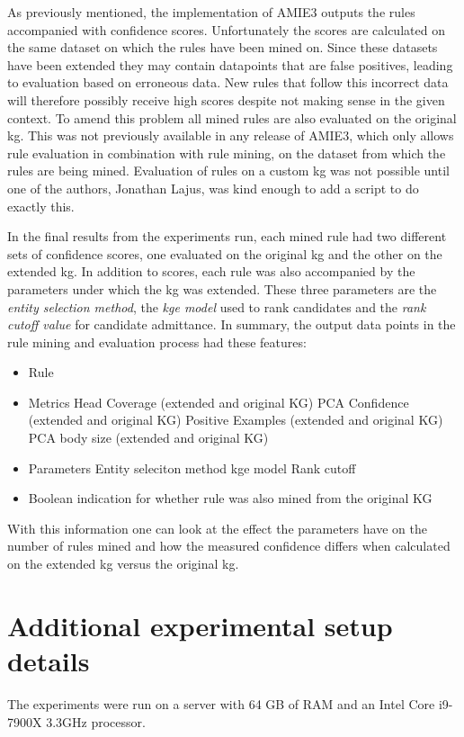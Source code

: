 As previously mentioned, the implementation of AMIE3 outputs the rules accompanied with confidence scores. Unfortunately the scores are calculated on the same dataset on which the rules have been mined on. Since these datasets have been extended they may contain datapoints that are false positives, leading to evaluation based on erroneous data. New rules that follow this incorrect data will therefore possibly receive high scores despite not making sense in the given context. To amend this problem all mined rules are also evaluated on the original \gls{kg}.
This was not previously available in any release of AMIE3, which only allows rule evaluation in combination with rule mining, on the dataset from which the rules are being mined. Evaluation of rules on a custom \gls{kg} was not possible until one of the authors, Jonathan Lajus, was kind enough to add a script to do exactly this.

In the final results from the experiments run, each mined rule had two different sets of confidence scores, one evaluated on the original \gls{kg} and the other on the extended \gls{kg}. In addition to scores, each rule was also accompanied by the parameters under which the \gls{kg} was extended. These three parameters are the \textit{entity selection method}, the \textit{\gls{kge} model} used to rank candidates and the \textit{rank cutoff value} for candidate admittance. In summary, the output data points in the rule mining and evaluation process had these features:
\begin{itemize}
    \item Rule
    \item Metrics
        \subitem Head Coverage (extended and original KG)
        \subitem PCA Confidence (extended and original KG)
        \subitem Positive Examples (extended and original KG)
        \subitem PCA body size (extended and original KG)
    \item Parameters
        \subitem Entity seleciton method
        \subitem \gls{kge} model
        \subitem Rank cutoff
    \item Boolean indication for whether rule was also mined from the original KG
\end{itemize}

With this information one can look at the effect the parameters have on the number of rules mined and how the measured confidence differs when calculated on the extended \gls{kg} versus the original \gls{kg}.


\section{Additional experimental setup details}
The experiments were run on a server with 64 GB of RAM and an Intel Core i9-7900X 3.3GHz processor.


